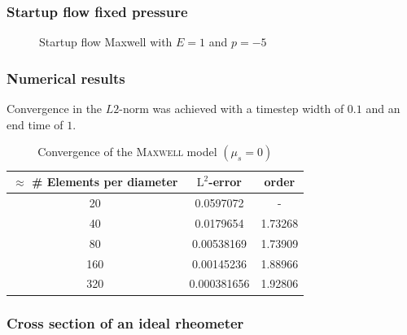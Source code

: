 \documentclass[12pt,a4paper,handout]{beamer}
\theoremstyle{definition}
\theoremstyle{plain}
\begin{document}
\begin{frame}
    \frametitle{Startup flow fixed pressure}
    \begin{figure}
        \caption{Startup flow Maxwell with $E=1$ and $p=-5$}
    \end{figure}
\end{frame}
\begin{frame}
    \frametitle{Numerical results}
    Convergence in the $L2$-norm was achieved with a timestep width of $0.1$ and an end time of $1$.
    \begin{table}
        \centering
        \begin{tabular}{c|c|c}
            $\approx$ \# Elements per diameter& $\mathrm{L}^2$-error&order\\
            \hline
            20 & 0.0597072 & -\\
            40 & 0.0179654 & 1.73268\\
            80 & 0.00538169 & 1.73909\\
            160 & 0.00145236 & 1.88966\\
            320 & 0.000381656 & 1.92806
        \end{tabular}
        \caption{Convergence of the \textsc{Maxwell} model $(\mu_s=0)$}
    \end{table}
\end{frame}
\begin{frame}
    \frametitle{Cross section of an ideal rheometer}
    
\end{frame}
\end{document}

